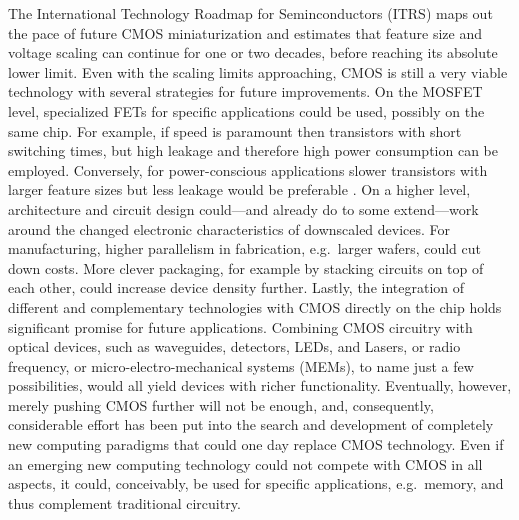The International Technology Roadmap for Seminconductors (ITRS) \cite{itrs2011}
maps out the pace of future CMOS miniaturization and estimates that feature size
and voltage scaling can continue for one or two decades, before reaching its
absolute lower limit. Even with the scaling limits approaching, CMOS is still a
very viable technology with several strategies for future improvements. On the
MOSFET level, specialized FETs for specific applications could be used, possibly
on the same chip. For example, if speed is paramount then transistors with short
switching times, but high leakage and therefore high power consumption can be
employed. Conversely, for power-conscious applications slower transistors with
larger feature sizes but less leakage would be preferable
\cite{cavin2012science}. On a higher level, architecture and circuit design
could---and already do to some extend---work around the changed electronic
characteristics of downscaled devices. For manufacturing, higher parallelism in
fabrication, e.g.~larger wafers, could cut down costs. More clever packaging,
for example by stacking circuits on top of each other, could increase device
density further. Lastly, the integration of different and complementary
technologies with CMOS directly on the chip holds significant promise for future
applications. Combining CMOS circuitry with optical devices, such as waveguides,
detectors, LEDs, and Lasers, or radio frequency, or micro-electro-mechanical
systems (MEMs), to name just a few possibilities, would all yield devices with
richer functionality. Eventually, however, merely pushing CMOS further will not
be enough, and, consequently, considerable effort has been put into the search
and development of completely new computing paradigms that could one day replace
CMOS technology. Even if an emerging new computing technology could not compete
with CMOS in all aspects, it could, conceivably, be used for specific
applications, e.g.~memory, and thus complement traditional circuitry.


